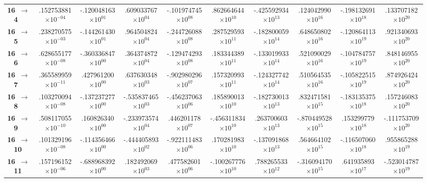 \documentclass[reviewcopy]{elsarticle}
\begin{document}
\begin{landscape}
\begin{longtable}{lccccccccc}
{\bf 16~$\to$~ 4}   &   .152753881$\times10^{-04}$ & -.120048163$\times10^{ 01}$ &  .609033767$\times10^{ 04}$ & -.101974745$\times10^{ 08}$ &  .862664644$\times10^{ 10}$ & -.425592934$\times10^{ 13}$ &  .124042990$\times10^{ 16}$ & -.198132691$\times10^{ 18}$ &  .133707182$\times10^{ 20}$ \\
{\bf 16~$\to$~ 5}   &   .238270575$\times10^{-03}$ & -.144261430$\times10^{ 01}$ &  .964504824$\times10^{ 04}$ & -.244726088$\times10^{ 08}$ &  .287529593$\times10^{ 11}$ & -.182800059$\times10^{ 14}$ &  .648650802$\times10^{ 16}$ & -.120864113$\times10^{ 19}$ &  .921340693$\times10^{ 20}$ \\
{\bf 16~$\to$~ 6}   &   .628655177$\times10^{-08}$ & -.360336847$\times10^{ 00}$ &  .364374872$\times10^{ 04}$ & -.129474293$\times10^{ 08}$ &  .183344389$\times10^{ 11}$ & -.133019933$\times10^{ 14}$ &  .521090029$\times10^{ 16}$ & -.104784757$\times10^{ 19}$ &  .848146955$\times10^{ 20}$ \\
{\bf 16~$\to$~ 7}   &   .365589959$\times10^{-11}$ &  .427961200$\times10^{ 00}$ &  .637630348$\times10^{ 03}$ & -.902980296$\times10^{ 07}$ &  .157320993$\times10^{ 11}$ & -.124327742$\times10^{ 14}$ &  .510564535$\times10^{ 16}$ & -.105822515$\times10^{ 19}$ &  .874926424$\times10^{ 20}$ \\
{\bf 16~$\to$~ 8}   &   .103270094$\times10^{-08}$ & -.137237277$\times10^{ 00}$ & -.535837465$\times10^{ 03}$ & -.456237063$\times10^{ 06}$ &  .185890013$\times10^{ 10}$ & -.182730013$\times10^{ 13}$ &  .832471581$\times10^{ 15}$ & -.183135375$\times10^{ 18}$ &  .157246083$\times10^{ 20}$ \\
{\bf 16~$\to$~ 9}   &   .508117055$\times10^{-10}$ &  .160826340$\times10^{ 00}$ & -.233973574$\times10^{ 04}$ &  .446201178$\times10^{ 07}$ & -.456311834$\times10^{ 10}$ &  .263700603$\times10^{ 13}$ & -.870449528$\times10^{ 15}$ &  .153299779$\times10^{ 18}$ & -.111753709$\times10^{ 20}$ \\
{\bf 16~$\to$~ 10}  &   .101329196$\times10^{-08}$ & -.114356466$\times10^{ 00}$ & -.444405893$\times10^{ 02}$ & -.922111483$\times10^{ 06}$ &  .170281983$\times10^{ 10}$ & -.137091868$\times10^{ 13}$ &  .564664102$\times10^{ 15}$ & -.116507060$\times10^{ 18}$ &  .955865288$\times10^{ 19}$ \\
{\bf 16~$\to$~ 11}  &   .157196152$\times10^{-06}$ & -.688968392$\times10^{ 00}$ &  .182492069$\times10^{ 03}$ &  .477582601$\times10^{ 06}$ & -.100267776$\times10^{ 10}$ &  .788265533$\times10^{ 12}$ & -.316094170$\times10^{ 15}$ &  .641935893$\times10^{ 17}$ & -.523014787$\times10^{ 19}$ \\

\end{longtable}
\end{landscape}
\end{document}
